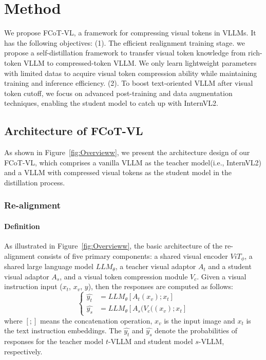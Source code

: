 \section{Method}
We propose FCoT-VL, a framework for compressing visual tokens in VLLMs. It has the following objectives: (1). The efficient realignment training stage. we propose a self-distillation framework to transfer visual token knowledge from rich-token VLLM to compressed-token VLLM. We only learn lightweight parameters with limited datas to acquire visual token compression ability while maintaining training and inference efficiency. (2). To boost text-oriented VLLM after visual token cutoff, we focus on advanced post-training and data augmentation techniques, enabling the student model to catch up with InternVL2.

\subsection{Architecture of FCoT-VL}
As shown in Figure~\ref{fig:Overvieww}, we present the architecture design of our FCoT-VL, which comprises a vanilla VLLM as the teacher model(i.e., InternVL2) and a VLLM with compressed visual tokens as the student model in the distillation process.
\subsubsection{Re-alignment}
\paragraph{Definition} As illustrated in Figure~\ref{fig:Overvieww}, the basic architecture of the re-alignment consists of five primary components: a shared visual encoder $ViT_{\phi}$, a shared large language model $LLM_{\theta}$, a teacher visual adaptor $A_t$ and a student visual adaptor $A_s$, and a visual token compression module $V_c$. Given a visual instruction input ($x_t$, $x_v$, $y$), then the responses are computed as follows:
\begin{equation}
    \left\{
    \begin{aligned}
        \hat{y_t} & = LLM_{\theta}[A_{t}(x_v);x_t] \\
        \hat{y_s} & = LLM_{\theta}[A_{s}(V_{c}((x_v);x_t]
    \end{aligned}
    \right.
\end{equation}
where $[;]$ means the concatenation operation, $x_v$ is the input image and $x_t$ is the text instruction embeddings. The $\hat{y_t}$ and $\hat{y_s}$ denote the probabilities of  responses for the teacher model $t$-VLLM and 
student model $s$-VLLM, respectively.
